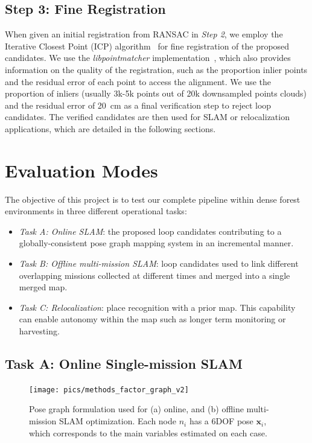 \subsection*{\textbf{Step 3: Fine Registration}}
\label{subsubsec:fine-registration}
When given an initial registration from RANSAC in \emph{Step 2}, we employ the Iterative Closest Point (ICP) algorithm~\cite{besl1992icp} for fine registration of the proposed candidates. We use the \emph{libpointmatcher} implementation~\cite{pomerleau2013iros}, which also provides information on the quality of the registration, such as the proportion inlier points and the residual error of each point to access the alignment.
We use the proportion of inliers (usually 3k-5k points out of 20k downsampled points clouds) and the residual error of \SI{20}{\centi\meter} as a final verification step to reject loop candidates. The verified candidates are then used for SLAM or relocalization applications, which are detailed in the following sections.

\section{Evaluation Modes} 
The objective of this project is to test our complete pipeline within dense forest environments in three different operational tasks: 
\begin{itemize}
  \itemsep1pt
  \item \emph{Task A: Online SLAM}: the proposed loop candidates contributing to a globally-consistent pose graph mapping system in an incremental manner.
  \item \emph{Task B: Offline multi-mission SLAM}: loop candidates used to link different overlapping missions collected at different times and merged into a single merged map.
  \item \emph{Task C: Relocalization}: place recognition with a prior map. This capability can enable autonomy within the map such as longer term monitoring or harvesting.
\end{itemize}

\subsection{Task A: Online Single-mission SLAM} 
\label{sec:online_slam_mode}
\begin{figure}[t]
  \centering
  \texttt{[image: pics/methods\_factor\_graph\_v2]}
  \caption{Pose graph formulation used for (a) online, and (b) offline multi-mission SLAM optimization. Each node $n_{i}$ has a 6DOF pose $\mathbf{x}_{i}$, which corresponds to the main variables estimated on each case.}
  \label{fig:factor_graph}
\end{figure}


